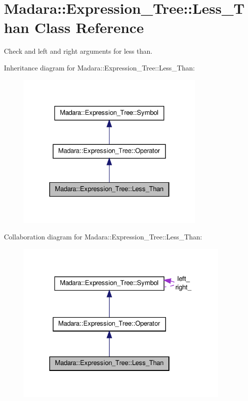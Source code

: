 \hypertarget{classMadara_1_1Expression__Tree_1_1Less__Than}{
\section{Madara::Expression\_\-Tree::Less\_\-Than Class Reference}
\label{d5/d22/classMadara_1_1Expression__Tree_1_1Less__Than}
}


Check and left and right arguments for less than.  




Inheritance diagram for Madara::Expression\_\-Tree::Less\_\-Than:
\nopagebreak
\begin{figure}[H]
\begin{center}
\leavevmode
\includegraphics[width=262pt]{dc/d7d/classMadara_1_1Expression__Tree_1_1Less__Than__inherit__graph}
\end{center}
\end{figure}


Collaboration diagram for Madara::Expression\_\-Tree::Less\_\-Than:
\nopagebreak
\begin{figure}[H]
\begin{center}
\leavevmode
\includegraphics[width=297pt]{d8/d77/classMadara_1_1Expression__Tree_1_1Less__Than__coll__graph}
\end{center}
\end{figure}
